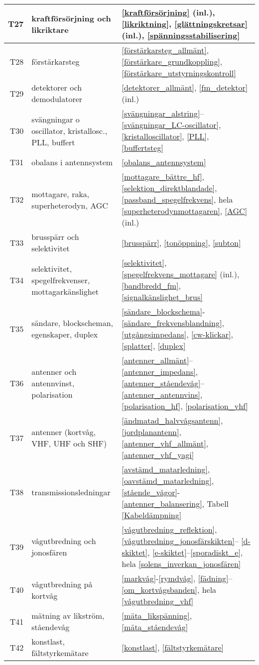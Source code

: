 \begin{table}[H]
\begin{tabular}{rll}
T27 & kraftförsörjning och likriktare &
\ref{kraftförsörjning} (inl.), \ref{likriktning}, \ref{glättningskretsar} (inl.), \ref{spänningsstabilisering}\\ \hline
T28 & förstärkarsteg & 
\ref{förstärkarsteg_allmänt}, \ref{förstärkare_grundkoppling}, 
\ref{förstärkare_utstyrningskontroll}\\ \hline
T29 & detektorer och demodulatorer & 
\ref{detektorer_allmänt}, \ref{fm_detektor} (inl.)\\ \hline
T30 & svängningar o oscillator, kristallosc., PLL, buffert & 
\ref{svängningar_alstring}--\ref{svängningar_LC-oscillator}, 
\ref{kristalloscillator}, \ref{PLL}, \ref{buffertsteg}\\ \hline
T31 & obalans i antennsystem & 
\ref{obalans_antennsystem}\\ \hline
T32 & mottagare, raka, superheterodyn, AGC & 
\ref{mottagare_bättre_hf}, \ref{selektion_direktblandade}, \ref{passband_spegelfrekvens}, 
hela \ref{superheterodynmottagaren}, \ref{AGC} (inl.)\\ \hline
T33 & brusspärr och selektivitet & 
\ref{brusspärr}, \ref{tonöppning}, \ref{subton}\\ \hline
T34 & selektivitet, spegelfrekvenser, mottagarkänslighet & 
\ref{selektivitet}, \ref{spegelfrekvens_mottagare} (inl.), 
\ref{bandbredd_fm}, \ref{signalkänslighet_brus}\\ \hline 
T35 & sändare, blockscheman, egenskaper, duplex & 
\ref{sändare_blockschema}-\ref{sändare_frekvensblandning}, \ref{utgångsimpedans}, \ref{cw-klickar}, \ref{splatter}, \ref{duplex}\\ \hline
T36 & antenner och antennvinst, polarisation &
\ref{antenner_allmänt}--\ref{antenner_impedans}, 
\ref{antenner_ståendevåg}--\ref{antenner_antennvins}, 
\ref{polarisation_hf}, \ref{polarisation_vhf}\\ \hline
T37 & antenner (kortvåg, VHF, UHF och SHF) &
\ref{ändmatad_halvvågsantenn}, \ref{jordplanantenn}, 
\ref{antenner_vhf_allmänt}, \ref{antenner_vhf_yagi}\\ \hline
T38 & transmissionsledningar & 
\ref{avstämd_matarledning}, \ref{oavstämd_matarledning}, \ref{stående_vågor}-
\ref{antenner_balansering}, Tabell \ref{Kabeldämpning}\\ \hline
T39 & vågutbredning och jonosfären & 
\ref{vågutbredning_reflektion}, \ref{vågutbredning_jonosfärskikten}--
\ref{d-skiktet}, \ref{e-skiktet}--\ref{sporadiskt_e}, hela 
\ref{solens_inverkan_jonosfären}\\ \hline
T40 & vågutbredning på kortvåg &
\ref{markvåg}-\ref{rymdvåg}, \ref{fädning}--\ref{om_kortvågsbanden}, hela \ref{vågutbredning_vhf}\\ \hline
T41 & mätning av likström, ståendevåg & 
\ref{mäta_likspänning}, \ref{mäta_ståendevåg}\\ \hline
T42 & konstlast, fältstyrkemätare & 
\ref{konstlast}, \ref{fältstyrkemätare}\\ \hline 
\end{tabular}
\normalsize
\end{table}

